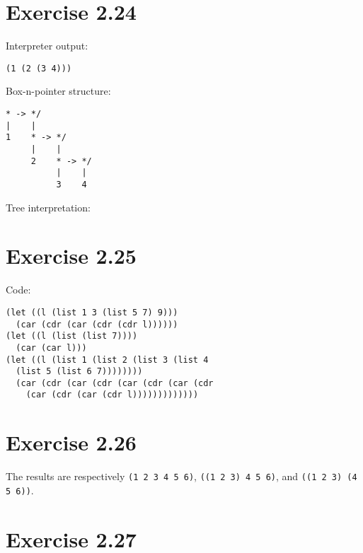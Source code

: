 \documentclass[../main.tex]{subfiles}
\begin{document}
\section{Exercise 2.24}

Interpreter output:

\begin{lstlisting}
(1 (2 (3 4)))
\end{lstlisting}

Box-n-pointer structure:

\begin{lstlisting}
* -> */
|    |
1    * -> */
     |    |
     2    * -> */
          |    |
          3    4
\end{lstlisting}

Tree interpretation:

\vspace{2mm}


\section{Exercise 2.25}

Code:

\begin{lstlisting}
(let ((l (list 1 3 (list 5 7) 9)))
  (car (cdr (car (cdr (cdr l))))))
(let ((l (list (list 7))))
  (car (car l)))
(let ((l (list 1 (list 2 (list 3 (list 4
  (list 5 (list 6 7))))))))
  (car (cdr (car (cdr (car (cdr (car (cdr
    (car (cdr (car (cdr l)))))))))))))
\end{lstlisting}

\section{Exercise 2.26}

The results are respectively
\lstinline{(1 2 3 4 5 6)},
\lstinline{((1 2 3) 4 5 6)},
and \lstinline{((1 2 3) (4 5 6))}.

\section{Exercise 2.27}
\end{document}
